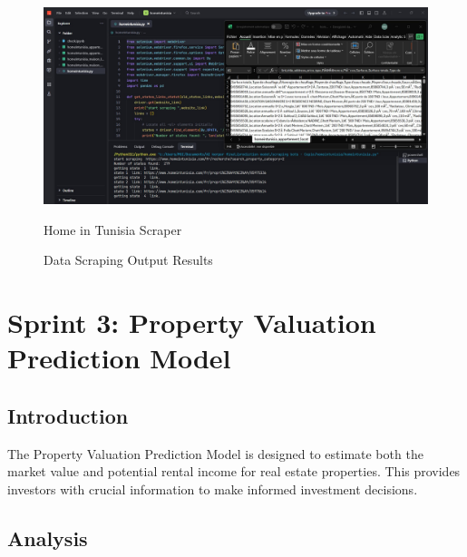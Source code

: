 \begin{figure}[htbp]
    \begin{minipage}{0.5\textwidth}
        \centering
        \includegraphics[width=\linewidth]{images/home_in_tunisia_scraper.jpeg}
        \caption*{Home in Tunisia Scraper}
    \end{minipage}
    \caption{Data Scraping Output Results}
    \label{fig:scraping-output}
\end{figure}

\newpage

\section{Sprint 3: Property Valuation Prediction Model}

\subsection*{Introduction}
The Property Valuation Prediction Model is designed to estimate both the market value and potential rental income for real estate properties. This provides investors with crucial information to make informed investment decisions.

\subsection{Analysis}
